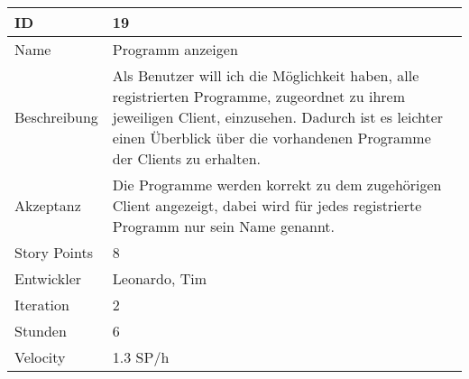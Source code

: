 
\begin{table}[htbp]
    \begin{minipage}{\linewidth}
        \setlength{\tymax}{0.5\linewidth}
        \centering
        \small
        \begin{tabulary}{\textwidth}{|l|p{10cm}|} \hline
            ID   &19\\\hline
            Name  &Programm anzeigen\\\hline
	    Beschreibung&Als Benutzer will ich die Möglichkeit haben, alle registrierten Programme, zugeordnet zu ihrem jeweiligen Client, einzusehen. Dadurch ist es leichter einen Überblick über die vorhandenen Programme der Clients zu erhalten.\\\hline
	    Akzeptanz &Die Programme werden korrekt zu dem zugehörigen Client angezeigt, dabei wird für jedes registrierte Programm nur sein Name genannt.\\\hline
            Story Points&8\\\hline
            Entwickler &Leonardo, Tim\\\hline
            Iteration &2\\\hline
            Stunden  &6\\\hline
            Velocity &1.3 SP\slash h\\\hline
        \end{tabulary}
    \end{minipage}
\end{table}



